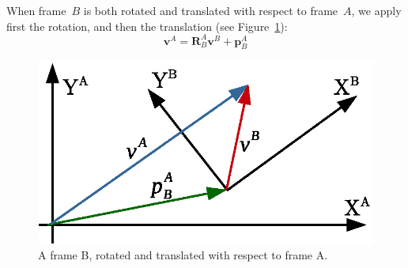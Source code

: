 When frame~$B$ is both rotated and translated with respect to frame~$A$, we apply first the rotation, and then the translation (see Figure~\ref{fig:rotation_translation}):
\begin{equation}
 \mathbf{v}^A = \mathbf{R}^A_B\mathbf{v}^B + \mathbf{p}^A_B
\end{equation}
\begin{figure}[bth!]
  \begin{center}
    \includegraphics[width=0.8\columnwidth]{figures/rotation_translation.eps}
    \caption{A frame B, rotated and translated with respect to frame A.}
    \label{fig:rotation_translation}
  \end{center}
\end{figure}



